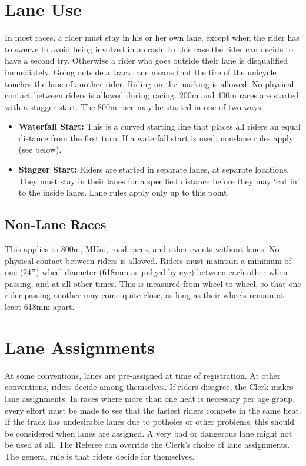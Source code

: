\section{Lane Use}
In most races, a rider must stay in his or her own lane, except when the rider has to swerve to avoid being involved in a crash.
In this case the rider can decide to have a second try.
Otherwise a rider who goes outside their lane is disqualified immediately.
Going outside a track lane means that the tire of the unicycle touches the lane of another rider.
Riding on the marking is allowed.
No physical contact between riders is allowed during racing.
200m and 400m races are started with a stagger start.
The 800m race may be started in one of two ways:
\begin{itemize}
\item \textbf{Waterfall Start:} This is a curved starting line that places all riders an equal distance from the first turn.
If a waterfall start is used, non-lane rules apply (see below).
\item \textbf{Stagger Start:} Riders are started in separate lanes, at separate locations.
They must stay in their lanes for a specified distance before they may ‘cut in’ to the inside lanes.
Lane rules apply only up to this point.
\end{itemize}

\subsection{Non-Lane Races \label{subsec:racing_lane-use_non-lane-races}}
This applies to 800m, MUni, road races, and other events without lanes.
No physical contact between riders is allowed.
Riders must maintain a minimum of one (24$"$) wheel diameter (618mm as judged by eye) between each other when passing, and at all other times.
This is measured from wheel to wheel, so that one rider passing another may come quite close, as long as their wheels remain at least 618mm apart.

\section{Lane Assignments}
At some conventions, lanes are pre-assigned at time of registration.
At other conventions, riders decide among themselves.
If riders disagree, the Clerk makes lane assignments.
In races where more than one heat is necessary per age group, every effort must be made to see that the fastest riders compete in the same heat.
If the track has undesirable lanes due to potholes or other problems, this should be considered when lanes are assigned.
A very bad or dangerous lane might not be used at all.
The Referee can override the Clerk’s choice of lane assignments.
The general rule is that riders decide for themselves.

